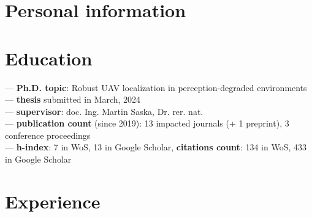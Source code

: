 \documentclass[11pt,a4paper,sans]{moderncv} %
\begin{document}
\makecvtitle %



\section{Personal information}


\section{Education}

{ --- \textbf{Ph.D. topic}: Robust UAV localization in perception-degraded environments\\
  --- \textbf{thesis} submitted in March, 2024\\
  --- \textbf{supervisor}: doc. Ing. Martin Saska, Dr. rer. nat.\\
  --- \textbf{publication count} (since 2019): 13 impacted journals (+ 1 preprint), 3 conference proceedings\\
  --- \textbf{h-index}: 7 in WoS, 13 in Google Scholar, \textbf{citations count}: 134 in WoS, 433 in Google Scholar}


\section{Experience}
\end{document}
